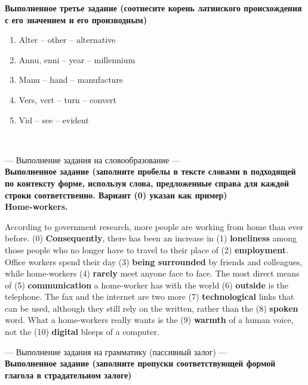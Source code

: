 \documentclass[main.tex]{subfiles}
\begin{document}
\textbf{Выполненное третье задание (соотнесите корень латинского происхождения с его значением и его производным)}

\begin{enumerate}[nosep]
	\item Alter -- other -- alternative
	\item Annu, enni -- year -- millennium
	\item Manu -- hand -- manufacture
	\item Vers, vert -- turn -- convert
	\item Vid -- see -- evident
\end{enumerate}
\ 


--- Выполнение задания на словообразование ---
\\

\textbf{Выполненное задание (заполните пробелы в тексте словами в подходящей по контексту форме, используя слова, предложенные справа для каждой строки соответственно. Вариант (0) указан как пример)}
\\

\textbf{Home-workers.}

According to government research, more people are working from home than ever before.
(0) \textbf{Consequently}, there has been an increase in (1) \textbf{loneliness} among those people who no longer have to travel to their place of (2) \textbf{employment}.
Office workers spend their day (3) \textbf{being surrounded} by friends and colleagues, while home-workers (4) \textbf{rarely} meet anyone face to face.
The most direct means of (5) \textbf{communication} a home-worker has with the world (6) \textbf{outside} is the telephone.
The fax and the internet are two more (7) \textbf{technological} links that can be used, although they still rely on the written, rather than the (8) \textbf{spoken} word.
What a home-workers really wants is the (9) \textbf{warmth} of a human voice, not the (10) \textbf{digital} bleeps of a computer.
\\


--- Выполнение задания на грамматику (пассивный залог) ---
\\

\textbf{Выполненное задание (заполните пропуски соответствующей формой глагола в страдательном залоге)}
\end{document}
